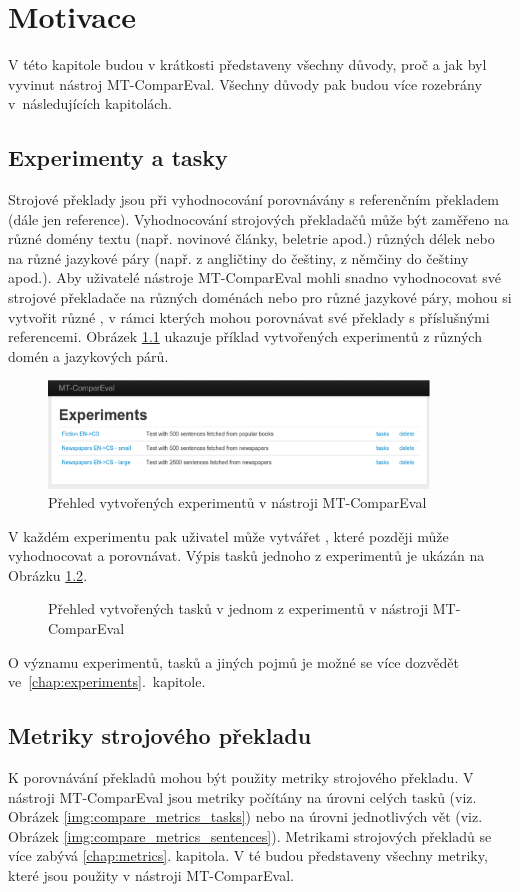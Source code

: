 \chapter{Motivace}
V této kapitole budou v krátkosti představeny všechny důvody,
  proč a jak byl vyvinut nástroj MT-ComparEval.
Všechny důvody pak budou více rozebrány v~následujících kapitolách.

\section{Experimenty a tasky}
Strojové překlady jsou při vyhodnocování porovnávány s referenčním překladem
  (dále jen reference).
Vyhodnocování strojových překladačů může být zaměřeno na různé domény textu (např. novinové články, beletrie apod.) různých délek
  nebo na různé jazykové páry (např. z angličtiny do češtiny, z němčiny do češtiny apod.).
Aby uživatelé nástroje MT-ComparEval mohli snadno vyhodnocovat své strojové překladače na různých doménách nebo pro různé jazykové páry,
  mohou si vytvořit různé ,
  v rámci kterých mohou porovnávat své překlady s příslušnými referencemi.
Obrázek \ref{img:experiments} ukazuje příklad vytvořených experimentů z různých domén a jazykových párů.
\begin{figure}
	\center
	\includegraphics[width=0.9\textwidth]{img/experiments.eps}

	\caption{Přehled vytvořených experimentů v nástroji MT-ComparEval}
	\label{img:experiments}
\end{figure}

V každém experimentu pak uživatel může vytvářet ,
  které později může vyhodnocovat a porovnávat.
Výpis tasků jednoho z experimentů je ukázán na Obrázku \ref{img:tasks}.
\begin{figure}
	\caption{Přehled vytvořených tasků v jednom z experimentů v nástroji MT-ComparEval}
	\label{img:tasks}
\end{figure}

O významu experimentů, tasků a jiných pojmů je možné se více dozvědět ve~\ref{chap:experiments}.~kapitole.


\section{Metriky strojového překladu}
K porovnávání překladů mohou být použity metriky strojového překladu.
V nástroji MT-ComparEval jsou metriky počítány na úrovni celých tasků 
  (viz. Obrázek \ref{img:compare_metrics_tasks})
  nebo na úrovni jednotlivých vět
  (viz. Obrázek \ref{img:compare_metrics_sentences}).
Metrikami strojových překladů se více zabývá \ref{chap:metrics}. kapitola.
V té budou představeny všechny metriky,
  které jsou použity v nástroji MT-ComparEval.

